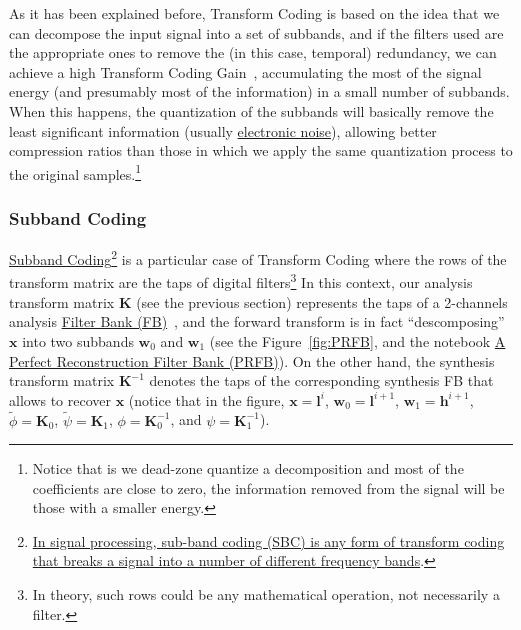 As it has been explained before, Transform Coding is based on the idea
that we can decompose the input signal into a set of subbands, and if
the filters used are the appropriate ones to remove the (in this case,
temporal) redundancy, we can achieve a high Transform Coding
Gain~\cite{sayood2017introduction}, accumulating the most of the
signal energy (and presumably most of the information) in a small
number of subbands. When this happens, the quantization of the
subbands will basically remove the least significant information
(usually
\href{https://en.wikipedia.org/wiki/Noise_(electronics)}{electronic
  noise}), allowing better compression ratios than those in which we
apply the same quantization process to the original
samples.\footnote{Notice that is we dead-zone quantize a decomposition
  and most of the coefficients are close to zero, the information
  removed from the signal will be those with a smaller energy.}


\subsubsection{Subband Coding}


\href{https://en.wikipedia.org/wiki/Sub-band_coding}{Subband
  Coding}\footnote{\href{https://en.wikipedia.org/wiki/Sub-band_coding}{In
    signal processing, sub-band coding (SBC) is any form of transform
    coding that breaks a signal into a number of different frequency
    bands}.} is a particular case of Transform Coding where the rows
of the transform matrix are the taps of digital filters\footnote{In
  theory, such rows could be any mathematical operation, not
  necessarily a filter.} In this context, our analysis transform
matrix ${\mathbf K}$ (see the previous section) represents the taps of
a 2-channels analysis
\href{https://en.wikipedia.org/wiki/Filter_bank}{Filter Bank
  (FB)}~\cite{vetterli1995wavelets}, and the forward transform is in
fact ``descomposing'' ${\mathbf x}$ into two subbands ${\mathbf w}_0$
and ${\mathbf w}_1$ (see the Figure~\ref{fig:PRFB}, and the notebook
\href{https://github.com/Tecnologias-multimedia/Tecnologias-multimedia.github.io/blob/master/contents/transform_coding/PRFB.ipynb}{A
  Perfect Reconstruction Filter Bank (PRFB)}). On the other hand, the
synthesis transform matrix ${\mathbf K}^{-1}$ denotes the taps of the
corresponding synthesis FB that allows to recover ${\mathbf x}$
(notice that in the figure, ${\mathbf x}={\mathbf l}^i$,
${\mathbf w}_0={\mathbf l}^{i+1}$, ${\mathbf w}_1={\mathbf h}^{i+1}$,
$\tilde\phi={\mathbf K}_0$, $\tilde\psi={\mathbf K}_1$,
$\phi={\mathbf K}^{-1}_0$, and $\psi={\mathbf K}^{-1}_1$).

